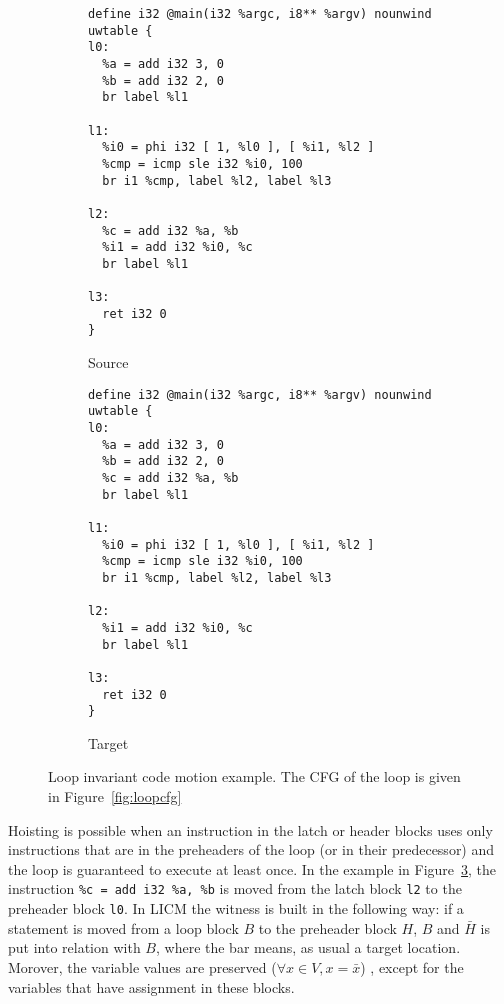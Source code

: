 \begin{figure}[t]
  \begin{mdframed}
  \centering
  \begin{subfigure}[b]{0.49\textwidth}
    \centering
    \begin{lstlisting}
define i32 @main(i32 %argc, i8** %argv) nounwind uwtable {
l0:
  %a = add i32 3, 0
  %b = add i32 2, 0
  br label %l1

l1:
  %i0 = phi i32 [ 1, %l0 ], [ %i1, %l2 ]
  %cmp = icmp sle i32 %i0, 100
  br i1 %cmp, label %l2, label %l3

l2:
  %c = add i32 %a, %b
  %i1 = add i32 %i0, %c
  br label %l1

l3:
  ret i32 0
}
    \end{lstlisting}
    \caption{Source}
    \label{fig:slicm}
  \end{subfigure}
  \begin{subfigure}[b]{0.49\textwidth}
    \centering
    \begin{lstlisting}
define i32 @main(i32 %argc, i8** %argv) nounwind uwtable {
l0:
  %a = add i32 3, 0
  %b = add i32 2, 0
  %c = add i32 %a, %b
  br label %l1

l1:
  %i0 = phi i32 [ 1, %l0 ], [ %i1, %l2 ]
  %cmp = icmp sle i32 %i0, 100
  br i1 %cmp, label %l2, label %l3

l2:
  %i1 = add i32 %i0, %c
  br label %l1

l3:
  ret i32 0
}
    \end{lstlisting}
    \caption{Target}
    \label{fig:tlicm}
  \end{subfigure}
  \end{mdframed}
  \caption[LOOP INVARIANT CODE MOTION EXAMPLE]{Loop invariant code motion example. The CFG of the loop is given in Figure~\ref{fig:loopcfg}}
  \label{fig:licm}
\end{figure}

Hoisting is possible when an instruction in the latch or header blocks uses only instructions that are in the preheaders of the loop (or in their predecessor) and the loop is guaranteed to execute at least once. In the example in Figure~\ref{fig:licm}, the instruction \texttt{\%c = add i32 \%a, \%b} is moved from the latch block \texttt{l2} to the preheader block \texttt{l0}. In LICM the witness is built in the following way: if a statement is moved from a loop block $B$ to the preheader block $H$, $B$ and $\bar{H}$ is put into relation with $B$, where the bar means, as usual a target location. Morover, the variable values are preserved ($\forall x \in V, x=\bar{x}$) , except for the variables that have assignment in these blocks.

